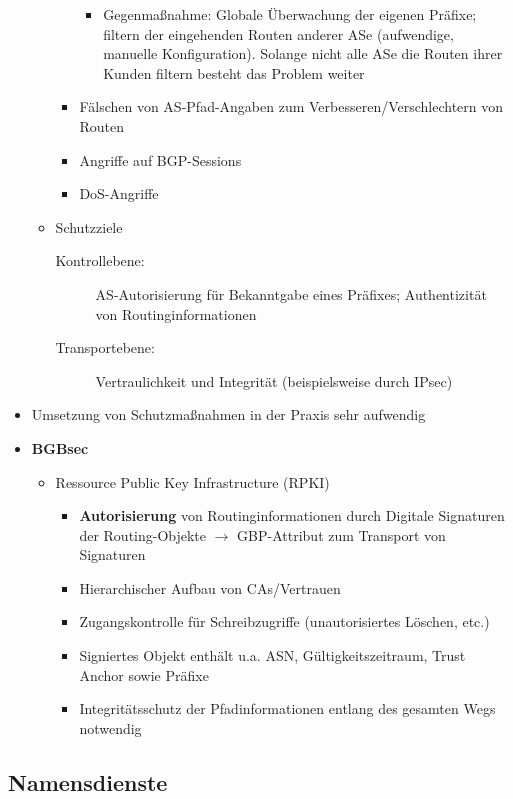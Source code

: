 \begin{itemize}
\begin{itemize}
\begin{itemize}
\begin{itemize}
				\item Gegenmaßnahme: Globale Überwachung der eigenen Präfixe; filtern der eingehenden Routen anderer ASe (aufwendige, manuelle Konfiguration). Solange nicht alle ASe die Routen ihrer Kunden filtern besteht das Problem weiter
			\end{itemize}
			\item Fälschen von AS-Pfad-Angaben zum Verbesseren/Verschlechtern von Routen
			\item Angriffe auf BGP-Sessions
			\item DoS-Angriffe
		\end{itemize}
		\item Schutzziele
		\begin{description}
			\item[Kontrollebene:] AS-Autorisierung für Bekanntgabe eines Präfixes; Authentizität von Routinginformationen
			\item[Transportebene:] Vertraulichkeit und Integrität (beispielsweise durch IPsec)
		\end{description}
	\end{itemize}
	\item Umsetzung von Schutzmaßnahmen in der Praxis sehr aufwendig
	\item \textbf{BGBsec}
	\begin{itemize}
		\item Ressource Public Key Infrastructure (RPKI)
		\begin{itemize}
			\item \textbf{Autorisierung} von Routinginformationen durch Digitale Signaturen der Routing-Objekte \(\rightarrow\) GBP-Attribut zum Transport von Signaturen
			\item Hierarchischer Aufbau von CAs/Vertrauen
			\item Zugangskontrolle für Schreibzugriffe (unautorisiertes Löschen, etc.)
			\item Signiertes Objekt enthält u.a. ASN, Gültigkeitszeitraum, Trust Anchor sowie Präfixe
			\item Integritätsschutz der Pfadinformationen entlang des gesamten Wegs notwendig
		\end{itemize}
	\end{itemize}
\end{itemize}


\subsection{Namensdienste}

